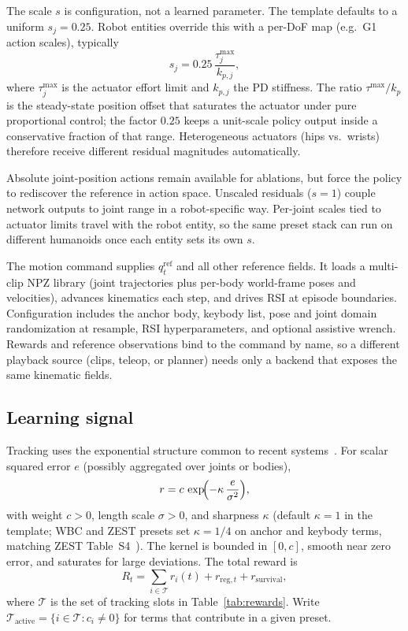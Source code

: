 \documentclass[11pt,a4paper]{article}
\begin{document}
The scale $s$ is configuration, not a learned parameter. The template defaults
to a uniform $s_j=0.25$. Robot entities override this with a per-DoF map
(e.g.\ G1 action scales), typically
\begin{equation}
  s_j = 0.25\,\frac{\tau^{\max}_j}{k_{p,j}},
  \label{eq:action-scale}
\end{equation}
where $\tau^{\max}_j$ is the actuator effort limit and $k_{p,j}$ the PD
stiffness. The ratio $\tau^{\max}/k_p$ is the steady-state position offset that
saturates the actuator under pure proportional control; the factor $0.25$ keeps
a unit-scale policy output inside a conservative fraction of that range.
Heterogeneous actuators (hips vs.\ wrists) therefore receive different residual
magnitudes automatically.

Absolute joint-position actions remain available for ablations, but force the
policy to rediscover the reference in action space. Unscaled residuals ($s=1$)
couple network outputs to joint range in a robot-specific way. Per-joint scales
tied to actuator limits travel with the robot entity, so the same preset stack
can run on different humanoids once each entity sets its own $s$.

The motion command supplies $q^{\mathrm{ref}}_t$ and all other reference
fields. It loads a multi-clip NPZ library (joint trajectories plus per-body
world-frame poses and velocities), advances kinematics each step, and drives
RSI at episode boundaries. Configuration includes the anchor body, keybody list,
pose and joint domain randomization at resample, RSI hyperparameters, and optional
assistive wrench. Rewards and reference observations bind to the command by name,
so a different playback source (clips, teleop, or planner) needs only a backend
that exposes the same kinematic fields.

\subsection{Learning signal}
\label{sec:rewards}
Tracking uses the exponential structure common to recent
systems~\citep{zest2026,liao2025beyondmimic,sonic2025,omnixtreme2026}. For
scalar squared error $e$ (possibly aggregated over joints or bodies),
\begin{equation}
  r = c \,
  \exp\!\Bigl(-\kappa\,\frac{e}{\sigma^2}\Bigr),
  \label{eq:track}
\end{equation}
with weight $c>0$, length scale $\sigma>0$, and sharpness $\kappa$ (default
$\kappa=1$ in the template; WBC and ZEST presets set $\kappa=1/4$ on anchor and
keybody terms, matching ZEST Table~S4~\citep{zest2026}). The kernel is bounded in
$[0,c]$, smooth near zero error, and saturates for large deviations. The total
reward is
\begin{equation}
  R_t = \sum_{i \in \mathcal{T}} r_i(t)
      + r_{\mathrm{reg},t}
      + r_{\mathrm{survival}},
  \label{eq:total}
\end{equation}
where $\mathcal{T}$ is the set of tracking slots in Table~\ref{tab:rewards}.
Write $\mathcal{T}_{\mathrm{active}}=\{i\in\mathcal{T}:c_i\neq 0\}$ for terms
that contribute in a given preset.
\end{document}
